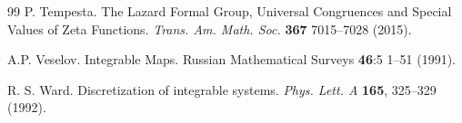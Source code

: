 \documentclass[10pt]{amsart}
\numberwithin{equation}{section}
\theoremstyle{definition}
\begin{document}
\begin{thebibliography}{99}
 P. Tempesta. The Lazard Formal Group, Universal Congruences and Special Values of Zeta Functions. \textit{Trans. Am. Math. Soc.} \textbf{367} 7015--7028 (2015).

 A.P. Veselov. Integrable Maps. Russian Mathematical Surveys \textbf{46}:5 1--51 (1991). 

 R. S. Ward. Discretization of integrable systems. \textit{Phys. Lett. A} \textbf{165}, 325--329 (1992).


\end{thebibliography}
\end{document}
